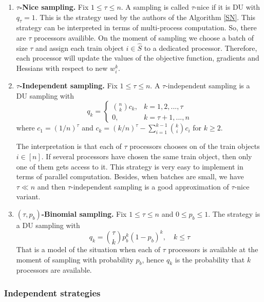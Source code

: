 \documentclass{article}
\theoremstyle{definition}
\theoremstyle{assumption}
\theoremstyle{lemma}
\theoremstyle{theorem}
\theoremstyle{proposition}
\begin{document}
	\begin{enumerate}
		\item \textbf{$\tau$-Nice sampling.} Fix $1 \leqslant \tau \leqslant n$. A sampling is called $\tau$-nice if it is DU with $q_\tau = 1$. This is the strategy used by the authors of the Algorithm \ref{SN}. This strategy can be interpreted in terms of multi-process computation. So, there are $\tau$ processors availible. On the moment of sampling we choose a batch of size $\tau$ and assign each train object $i \in \hat S$ to a dedicated processor. Therefore, each processor will update the values of the objective function, gradients and Hessians with respect to new $w_i^k$.
		
		\item \textbf{$\tau$-Independent sampling.} Fix $1 \leqslant \tau \leqslant n$. A $\tau$-independent sampling is a DU sampling with 
		\begin{equation} 
			q_k = 
			\begin{cases}
				\binom{n}{k}c_k, & k = 1, 2, ..., \tau \\
				0, & k = \tau + 1, ..., n
			\end{cases}
		\end{equation}
		where $c_1 = (1/n)^\tau$ and $c_k = (k/n)^\tau - \sum \limits_{i=1}^{k-1} \binom{k}{i}c_i$ for $k \geqslant 2$.
		
		The interpretation is that each of $\tau$ processors chooses on of the train objects $i \in [n]$. If several processors have chosen the same train object, then only one of them gets access to it. This strategy is very easy to implement in terms of parallel computation. Besides, when batches are small, we have $\tau \ll n$ and then $\tau$-independent sampling is a good approximation of $\tau$-nice variant.
		
		\item \textbf{$(\tau, p_b)$-Binomial sampling.} Fix $1 \leqslant \tau \leqslant n$ and $0 \leqslant p_b \leqslant 1$. The strategy is a DU sampling with
		\begin{equation}
			q_k = \binom{\tau}{k}p_b^k(1 - p_b)^k, \quad k \leqslant \tau
		\end{equation}
		That is a model of the situation when each of $\tau$ processors is available at the moment of sampling with probability $p_b$, hence $q_k$ is the probability that $k$ processors are available.
	\end{enumerate}

	\subsubsection{Independent strategies}
	
\end{document}
